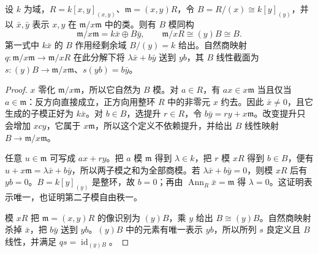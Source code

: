 \begin{proposition}\label{b3:prop:abs-splitting-example}
	设 \(k\) 为域，\(R=k[x,y]_{(x,y)}\)、\(\mathfrak m=(x,y)R\)，令 \(B=R/(x)\cong k[y]_{(y)}\)，并以 \(\bar x,\bar y\) 表示 \(x,y\) 在 \(\mathfrak m/x\mathfrak m\) 中的类。则有 \(B\) 模同构
	\[
		\mathfrak m/x\mathfrak m=k\bar x\oplus B\bar y, \qquad \mathfrak m/xR\cong(y)B\cong B.
	\]
	第一式中 \(k\bar x\) 的 \(B\) 作用经剩余域 \(B/(y)=k\) 给出。自然商映射 \(q:\mathfrak m/x\mathfrak m\to\mathfrak m/xR\) 在此分解下将 \(\lambda\bar x+b\bar y\) 送到 \(yb\)，其 \(B\) 线性截面为 \(s:(y)B\to\mathfrak m/x\mathfrak m\)、\(s(yb)=b\bar y\)。
\end{proposition}
\begin{proof}
	\(x\) 零化 \(\mathfrak m/x\mathfrak m\)，所以它自然为 \(B\) 模。对 \(a\in R\)，有 \(ax\in x\mathfrak m\) 当且仅当 \(a\in\mathfrak m\)：反方向直接成立，正方向用整环 \(R\) 中的非零元 \(x\) 约去。因此 \(\bar x\ne0\)，且它生成的子模正好为 \(k\bar x\)。对 \(b\in B\)，选提升 \(r\in R\)，令 \(b\bar y=ry+x\mathfrak m\)。改变提升只会增加 \(xcy\)，它属于 \(x\mathfrak m\)，所以这个定义不依赖提升，并给出 \(B\) 线性映射 \(B\to\mathfrak m/x\mathfrak m\)。

	任意 \(u\in\mathfrak m\) 可写成 \(ax+ry\)。把 \(a\) 模 \(\mathfrak m\) 得到 \(\lambda\in k\)，把 \(r\) 模 \(xR\) 得到 \(b\in B\)，便有 \(u+x\mathfrak m=\lambda\bar x+b\bar y\)，所以两子模之和为全部商模。若 \(\lambda\bar x+b\bar y=0\)，则模 \(xR\) 后有 \(yb=0\)。\(B=k[y]_{(y)}\) 是整环，故 \(b=0\)；再由 \(\operatorname{Ann}_R\bar x=\mathfrak m\) 得 \(\lambda=0\)。这证明表示唯一，也证明第二子模自由秩一。

	模 \(xR\) 把 \(\mathfrak m=(x,y)R\) 的像识别为 \((y)B\)，乘 \(y\) 给出 \(B\cong(y)B\)。自然商映射杀掉 \(\bar x\)，把 \(b\bar y\) 送到 \(yb\)。\((y)B\) 中的元素有唯一表示 \(yb\)，所以所列 \(s\) 良定义且 \(B\) 线性，并满足 \(qs=\operatorname{id}_{(y)B}\)。
\end{proof}
